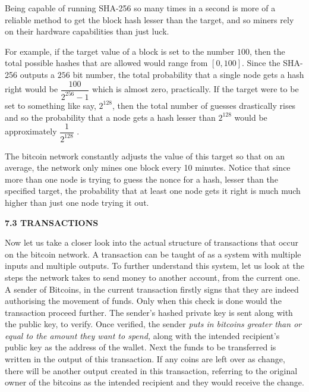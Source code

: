 \documentclass[12pt,a4paper]{report}
\begin{document}
\begin{flushleft}
Being capable of running SHA-256 so many times in a second is more of a reliable method to get the block hash lesser than the target, and so miners rely on their hardware capabilities than just luck. \newline

For example, if the target value of a block is set to the number $100$, then the total possible hashes that are allowed would range from $[0,100]$. Since the SHA-256 outputs a $256$ bit number, the total probability that a single node gets a hash right would be $\dfrac{100}{2^{256}-1}$ which is almost zero, practically.\newline
If the target were to be set to something like say, $2^{128}$, then the total number of guesses drastically rises and so the probability that a node gets a hash lesser than $2^{128}$ would be approximately $\dfrac{1}{2^{128}}$  .

\vspace{10mm}
The bitcoin network constantly adjusts the value of this target so that on an average, the network only mines one block every 10 minutes. Notice that since more than one node is trying to guess the nonce for a hash, lesser than the specified target, the probability that at least one node gets it right is much much higher than just one node trying it out.

\vspace{10mm}
\textbf{7.3 TRANSACTIONS}
\vspace{7mm}

Now let us take a closer look into the actual structure of transactions that occur on the bitcoin network. A transaction can be taught of as a system with multiple inputs and multiple outputs.\newline
To further understand this system, let us look at the steps the network takes to send money to another account, from the current one.\newline
A sender of Bitcoins, in the current transaction firstly signs that they are indeed authorising the movement of funds. Only when this check is done would the transaction proceed further. The sender's hashed private key is sent along with the public key, to verify. Once verified, the sender \textit{puts in bitcoins greater than or equal to the amount they want to spend,} along with the intended recipient's public key as the address of the wallet. Next the funds to be transferred is written in the output of this transaction. If any coins are left over as change, there will be another output created in this transaction, referring to the original owner of the bitcoins as the intended recipient and they would receive the change.\newline




\end{flushleft}
\end{document}

